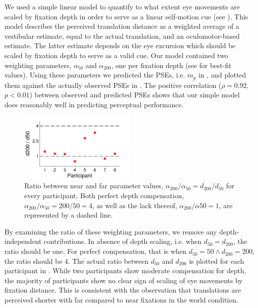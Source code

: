 We used a simple linear model to quantify to what extent eye movements are scaled by fixation depth in order to serve as a linear self-motion cue (see ). This model describes the perceived translation distance as a weighted average of a vestibular estimate, equal to the actual translation, and an oculomotor-based estimate. The latter estimate depends on the eye excursion which should be scaled by fixation depth to serve as a valid cue. Our model contained two weighting parameters, $\alpha_{50}$ and $\alpha_{200}$, one per fixation depth (see  for best-fit values). Using these parameters we predicted the PSEs, i.e. $m_p$ in , and plotted them against the actually observed PSEs in . The positive correlation ($\rho = 0.92$, $p < 0.01$) between observed and predicted PSEs shows that our simple model does reasonably well in predicting perceptual performance.

\begin{figure}
    \includegraphics[width=0.5\textwidth]{src/paper4/p4_figure5.pdf}

	\caption{Ratio between near and far parameter values, $\alpha_{200} / \alpha_{50} = d_{200} / d_{50}$ for every participant. Both perfect depth compensation, $\alpha_{200} / \alpha_{50} = 200 / 50 = 4$, as well as the lack thereof, $\alpha_{200} / \alpha{50} = 1$, are represented by a dashed line.}
	\label{p4:fig5}
\end{figure}

By examining the ratio of these weighting parameters, we remove any depth-independent contributions. In absence of  depth scaling, i.e. when $d_{50} = d_{200}$, the ratio should be one. For perfect compensation, that is when $d_{50} = 50  \wedge d_{200} = 200$, the ratio should be $4$. The actual ratio between $d_{50}$ and $d_{200}$ is plotted for each participant in . While two participants show moderate compensation for depth, the majority of participants show no clear sign of scaling of eye movements by fixation distance. This is consistent with the observation that translations are perceived shorter with far compared to near fixations in the world condition.


